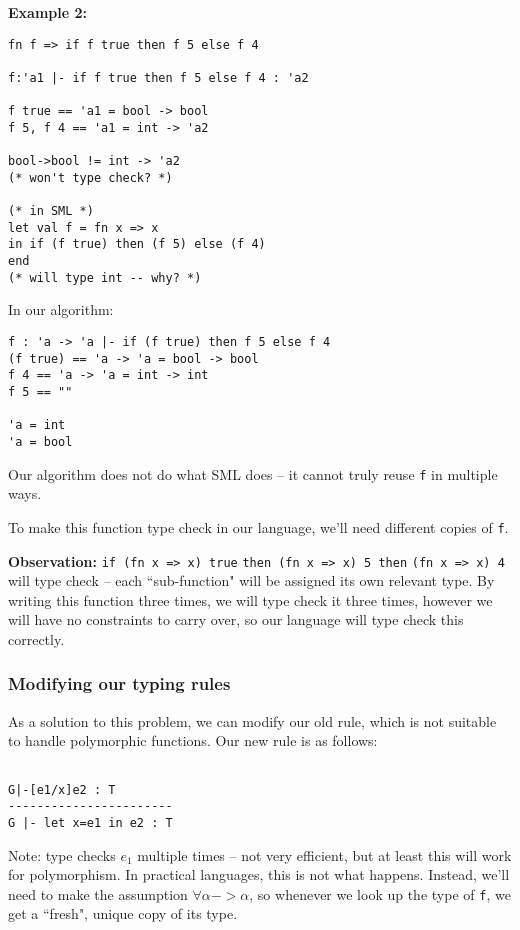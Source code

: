 \documentclass[11pt]{article}
\begin{document}
\textbf{Example 2:}
\begin{verbatim}
fn f => if f true then f 5 else f 4

f:'a1 |- if f true then f 5 else f 4 : 'a2

f true == 'a1 = bool -> bool
f 5, f 4 == 'a1 = int -> 'a2

bool->bool != int -> 'a2
(* won't type check? *)

(* in SML *)
let val f = fn x => x
in if (f true) then (f 5) else (f 4)
end
(* will type int -- why? *)
\end{verbatim}

In our algorithm:
\begin{verbatim}
f : 'a -> 'a |- if (f true) then f 5 else f 4
(f true) == 'a -> 'a = bool -> bool
f 4 == 'a -> 'a = int -> int
f 5 == ""

'a = int
'a = bool
\end{verbatim}

Our algorithm does not do what SML does -- it cannot truly reuse \verb~f~ in multiple ways.

To make this function type check in our language, we'll need different copies of \verb~f~.

\textbf{Observation:} \verb~if (fn x => x) true~ \verb~then (fn x => x) 5 then~ \verb~(fn x => x) 4~ will type check -- each ``sub-function" will be assigned its own relevant type. By writing this function three times, we will type check it three times, however we will have no constraints to carry over, so our language will type check this correctly.

\subsubsection{Modifying our typing rules}
As a solution to this problem, we can modify our old rule, which is not suitable to handle polymorphic functions. Our new rule is as follows:

\begin{verbatim}

G|-[e1/x]e2 : T
-----------------------
G |- let x=e1 in e2 : T
\end{verbatim}

Note: type checks $e_1$ multiple times -- not very efficient, but at least this will work for polymorphism. In practical languages, this is not what happens. Instead, we'll need to make the assumption $\forall \alpha -> \alpha$, so whenever we look up the type of \verb~f~, we get a ``fresh", unique copy of its type. 
\end{document}
